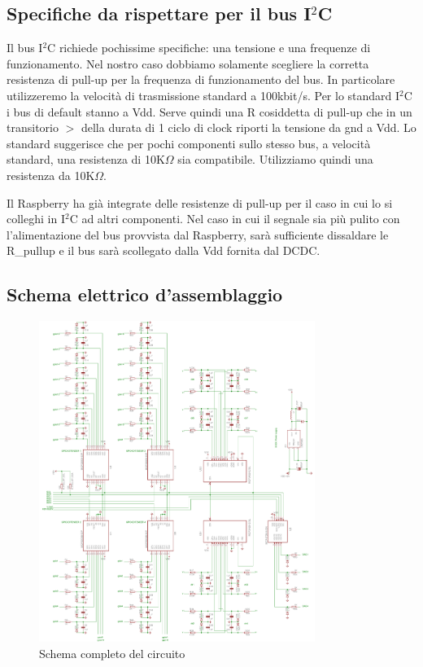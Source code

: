 \documentclass[10pt]{article}
\begin{document}
	\subsection{Specifiche da rispettare per il bus I\(^2\)C}

		Il bus I\(^2\)C richiede pochissime specifiche: una tensione e una frequenze di funzionamento.
		Nel nostro caso dobbiamo solamente scegliere la corretta resistenza di pull-up per la frequenza di funzionamento del bus.
		In particolare utilizzeremo la velocità di trasmissione standard a 100kbit/s.
		Per lo standard I\(^2\)C i bus di default stanno a Vdd. Serve quindi una R cosiddetta di pull-up che in un transitorio \(>\) della durata di 1 ciclo di clock riporti la tensione da gnd a Vdd.
		Lo standard suggerisce che per pochi componenti sullo stesso bus, a velocità standard, una resistenza di 10K\(\Omega\) sia compatibile.
		Utilizziamo quindi una resistenza da 10K\(\Omega\).

		Il Raspberry ha già integrate delle resistenze di pull-up per il caso in cui lo si colleghi in I\(^2\)C ad altri componenti.
		Nel caso in cui il segnale sia più pulito con l'alimentazione del bus provvista dal Raspberry, sarà sufficiente dissaldare le R\_pullup e il bus sarà scollegato dalla Vdd fornita dal DCDC.

	\newpage
	\subsection{Schema elettrico d'assemblaggio}
	\begin{figure}[h]
	\centering
	\includegraphics[width=0.8\textwidth]{src/full_schematic}
	\caption{Schema completo del circuito}\label{fig:ccircuit}
	\end{figure}
\end{document}
